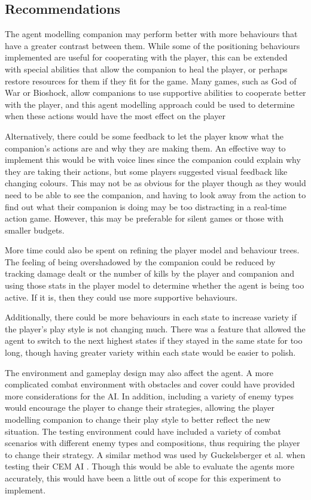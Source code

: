 \documentclass{IEEEtran}
\begin{document}
\subsection{Recommendations}
\label{Recommendations}

The agent modelling companion may perform better with more behaviours that have a greater contrast between them. While some of the positioning behaviours implemented are useful for cooperating with the player, this can be extended with special abilities that allow the companion to heal the player, or perhaps restore resources for them if they fit for the game. Many games, such as God of War or Bioshock, allow companions to use supportive abilities to cooperate better with the player, and this agent modelling approach could be used to determine when these actions would have the most effect on the player \cite{AIGamesBioshockAI, GDCAtreus}

Alternatively, there could be some feedback to let the player know what the companion’s actions are and why they are making them. An effective way to implement this would be with voice lines since the companion could explain why they are taking their actions, but some players suggested visual feedback like changing colours. This may not be as obvious for the player though as they would need to be able to see the companion, and having to look away from the action to find out what their companion is doing may be too distracting in a real-time action game. However, this may be preferable for silent games or those with smaller budgets.

More time could also be spent on refining the player model and behaviour trees. The feeling of being overshadowed by the companion could be reduced by tracking damage dealt or the number of kills by the player and companion and using those stats in the player model to determine whether the agent is being too active. If it is, then they could use more supportive behaviours.

Additionally, there could be more behaviours in each state to increase variety if the player’s play style is not changing much. There was a feature that allowed the agent to switch to the next highest states if they stayed in the same state for too long, though having greater variety within each state would be easier to polish.

The environment and gameplay design may also affect the agent. A more complicated combat environment with obstacles and cover could have provided more considerations for the AI. In addition, including a variety of enemy types would encourage the player to change their strategies, allowing the player modelling companion to change their play style to better reflect the new situation. The testing environment could have included a variety of combat scenarios with different enemy types and compositions, thus requiring the player to change their strategy. A similar method was used by Guckelsberger et al. when testing their CEM AI \cite{CoupledEmpowermentMaximisation}. Though this would be able to evaluate the agents more accurately, this would have been a little out of scope for this experiment to implement.
\end{document}
